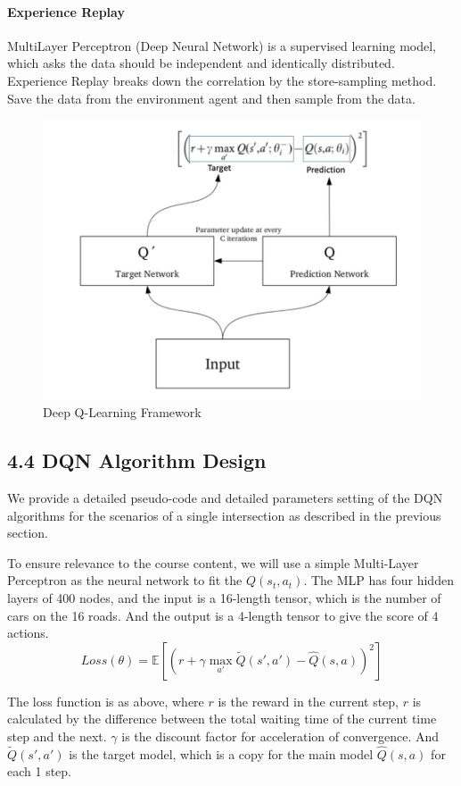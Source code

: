\documentclass[letterpaper]{article} %
\begin{document}
\paragraph{Experience Replay} MultiLayer Perceptron (Deep Neural Network) is a supervised learning model, which asks the data should be independent and identically distributed. Experience Replay breaks down the correlation by the store-sampling method. Save the data from the environment agent and then sample from the data.

\begin{figure}[h]
	\centering
	\includegraphics[width=0.8\linewidth, frame]{DQN}
	\caption{Deep Q-Learning Framework}
	\label{fig:dqn}
\end{figure}

\subsection{4.4 DQN Algorithm Design}
\hspace*{1em}We provide a detailed pseudo-code and detailed parameters setting of the DQN algorithms for the scenarios of a single intersection as described in the previous section.

To ensure relevance to the course content, we will use a simple Multi-Layer Perceptron as the neural network to fit the $Q(s_t,a_t)$. The MLP has four hidden layers of 400 nodes, and the input is a 16-length tensor, which is the number of cars on the 16 roads. And the output is a 4-length tensor to give the score of 4 actions.
$$Loss(\theta) = \mathbb{E}\left[\left(r+\gamma\max_{a'} \tilde{Q}(s',a')-\hat{Q}(s,a)\right)^2\right]$$

The loss function is as above, where $r$ is the reward in the current step, $r$ is calculated by the difference between the total waiting time of the current time step and the next. $\gamma$ is the discount factor for acceleration of convergence. And $\tilde{Q}(s',a')$ is the target model, which is a copy for the main model $\hat{Q}(s,a)$ for each 1 step.
\end{document}
